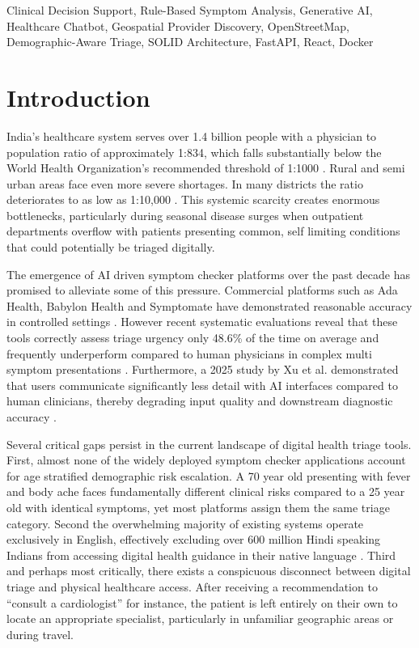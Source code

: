 \documentclass[conference]{IEEEtran}
\begin{document}
\begin{IEEEkeywords}
Clinical Decision Support, Rule-Based Symptom Analysis, Generative AI, Healthcare Chatbot, Geospatial Provider Discovery, OpenStreetMap, Demographic-Aware Triage, SOLID Architecture, FastAPI, React, Docker
\end{IEEEkeywords}

\section{Introduction}

India's healthcare system serves over 1.4 billion people with a physician to population ratio of approximately 1:834, which falls substantially below the World Health Organization's recommended threshold of 1:1000 \cite{b1}. Rural and semi urban areas face even more severe shortages. In many districts the ratio deteriorates to as low as 1:10,000 \cite{b2}. This systemic scarcity creates enormous bottlenecks, particularly during seasonal disease surges when outpatient departments overflow with patients presenting common, self limiting conditions that could potentially be triaged digitally.

The emergence of AI driven symptom checker platforms over the past decade has promised to alleviate some of this pressure. Commercial platforms such as Ada Health, Babylon Health and Symptomate have demonstrated reasonable accuracy in controlled settings \cite{b3}. However recent systematic evaluations reveal that these tools correctly assess triage urgency only 48.6\% of the time on average and frequently underperform compared to human physicians in complex multi symptom presentations \cite{b4}. Furthermore, a 2025 study by Xu et al. demonstrated that users communicate significantly less detail with AI interfaces compared to human clinicians, thereby degrading input quality and downstream diagnostic accuracy \cite{b5}.

Several critical gaps persist in the current landscape of digital health triage tools. First, almost none of the widely deployed symptom checker applications account for age stratified demographic risk escalation. A 70 year old presenting with fever and body ache faces fundamentally different clinical risks compared to a 25 year old with identical symptoms, yet most platforms assign them the same triage category. Second the overwhelming majority of existing systems operate exclusively in English, effectively excluding over 600 million Hindi speaking Indians from accessing digital health guidance in their native language \cite{b6}. Third and perhaps most critically, there exists a conspicuous disconnect between digital triage and physical healthcare access. After receiving a recommendation to ``consult a cardiologist'' for instance, the patient is left entirely on their own to locate an appropriate specialist, particularly in unfamiliar geographic areas or during travel.
\end{document}
